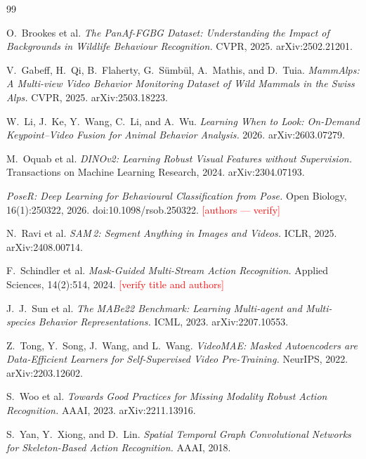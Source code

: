 \documentclass[12pt,a4paper]{report}
\begin{document}
\begin{thebibliography}{99}

 O.~Brookes et al. \emph{The PanAf-FGBG Dataset: Understanding the Impact of Backgrounds in Wildlife Behaviour Recognition.} CVPR, 2025. arXiv:2502.21201.

 V.~Gabeff, H.~Qi, B.~Flaherty, G.~S\"umb\"ul, A.~Mathis, and D.~Tuia. \emph{MammAlps: A Multi-view Video Behavior Monitoring Dataset of Wild Mammals in the Swiss Alps.} CVPR, 2025. arXiv:2503.18223.

 W.~Li, J.~Ke, Y.~Wang, C.~Li, and A.~Wu. \emph{Learning When to Look: On-Demand Keypoint--Video Fusion for Animal Behavior Analysis.} 2026. arXiv:2603.07279.

 M.~Oquab et al. \emph{DINOv2: Learning Robust Visual Features without Supervision.} Transactions on Machine Learning Research, 2024. arXiv:2304.07193.

 \emph{PoseR: Deep Learning for Behavioural Classification from Pose.} Open Biology, 16(1):250322, 2026. doi:10.1098/rsob.250322. \textcolor{red}{[authors --- verify]}

 N.~Ravi et al. \emph{SAM\,2: Segment Anything in Images and Videos.} ICLR, 2025. arXiv:2408.00714.

 F.~Schindler et al. \emph{Mask-Guided Multi-Stream Action Recognition.} Applied Sciences, 14(2):514, 2024. \textcolor{red}{[verify title and authors]}

 J.~J.~Sun et al. \emph{The MABe22 Benchmark: Learning Multi-agent and Multi-species Behavior Representations.} ICML, 2023. arXiv:2207.10553.

 Z.~Tong, Y.~Song, J.~Wang, and L.~Wang. \emph{VideoMAE: Masked Autoencoders are Data-Efficient Learners for Self-Supervised Video Pre-Training.} NeurIPS, 2022. arXiv:2203.12602.

 S.~Woo et al. \emph{Towards Good Practices for Missing Modality Robust Action Recognition.} AAAI, 2023. arXiv:2211.13916.

 S.~Yan, Y.~Xiong, and D.~Lin. \emph{Spatial Temporal Graph Convolutional Networks for Skeleton-Based Action Recognition.} AAAI, 2018.

\end{thebibliography}
\end{document}
